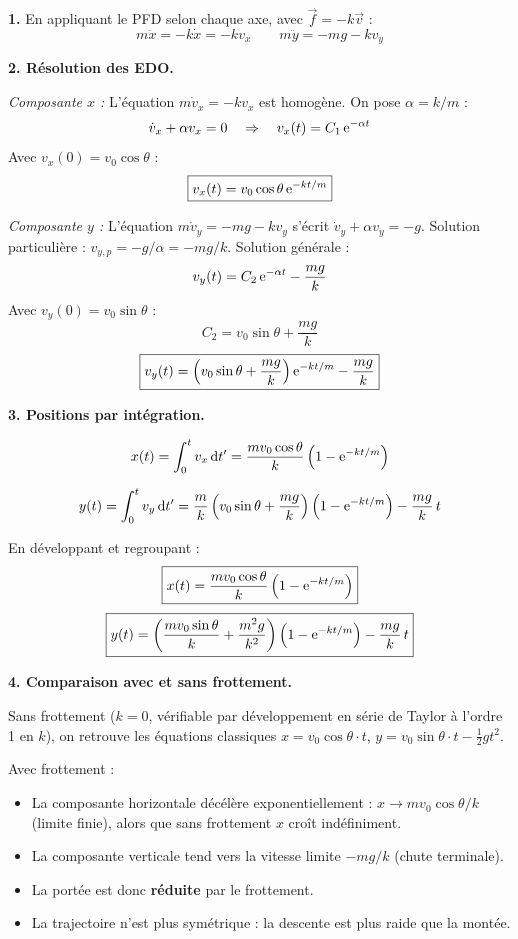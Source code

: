 \documentclass[12pt,a4paper]{article}
\begin{document}
\begin{boitecorrige}
\textbf{1.} En appliquant le PFD selon chaque axe, avec $\vec{f} = -k\vec{v}$ :
\[
m\ddot{x} = -k\dot{x} = -kv_x \qquad m\ddot{y} = -mg - kv_y
\]

\textbf{2. Résolution des EDO.}

\textit{Composante $x$ :} L'équation $m\dot{v}_x = -kv_x$ est homogène. On pose $\alpha = k/m$ :
\[
\dot{v}_x + \alpha v_x = 0 \quad \Rightarrow \quad v_x(t) = C_1\,\mathrm{e}^{-\alpha t}
\]
Avec $v_x(0) = v_0\cos\theta$ :
\[
\boxed{v_x(t) = v_0\cos\theta\,\mathrm{e}^{-kt/m}}
\]

\textit{Composante $y$ :} L'équation $m\dot{v}_y = -mg - kv_y$ s'écrit $\dot{v}_y + \alpha v_y = -g$. Solution particulière : $v_{y,p} = -g/\alpha = -mg/k$. Solution générale :
\[
v_y(t) = C_2\,\mathrm{e}^{-\alpha t} - \frac{mg}{k}
\]
Avec $v_y(0) = v_0\sin\theta$ :
\[
C_2 = v_0\sin\theta + \frac{mg}{k}
\]
\[
\boxed{v_y(t) = \left(v_0\sin\theta + \frac{mg}{k}\right)\mathrm{e}^{-kt/m} - \frac{mg}{k}}
\]

\textbf{3. Positions par intégration.}

\[
x(t) = \int_0^t v_x\,\mathrm{d} t' = \frac{mv_0\cos\theta}{k}\left(1 - \mathrm{e}^{-kt/m}\right)
\]

\[
y(t) = \int_0^t v_y\,\mathrm{d} t' = \frac{m}{k}\left(v_0\sin\theta + \frac{mg}{k}\right)\left(1 - \mathrm{e}^{-kt/m}\right) - \frac{mg}{k}\,t
\]

En développant et regroupant :
\[
\boxed{x(t) = \frac{mv_0\cos\theta}{k}\left(1 - \mathrm{e}^{-kt/m}\right)}
\]
\[
\boxed{y(t) = \left(\frac{mv_0\sin\theta}{k} + \frac{m^2 g}{k^2}\right)\left(1 - \mathrm{e}^{-kt/m}\right) - \frac{mg}{k}\,t}
\]

\textbf{4. Comparaison avec et sans frottement.}

Sans frottement ($k = 0$, vérifiable par développement en série de Taylor à l'ordre 1 en $k$), on retrouve les équations classiques $x = v_0\cos\theta\cdot t$, $y = v_0\sin\theta\cdot t - \frac{1}{2}gt^2$.

Avec frottement :
\begin{itemize}[nosep]
  \item La composante horizontale décélère exponentiellement : $x \to mv_0\cos\theta/k$ (limite finie), alors que sans frottement $x$ croît indéfiniment.
  \item La composante verticale tend vers la vitesse limite $-mg/k$ (chute terminale).
  \item La portée est donc \textbf{réduite} par le frottement.
  \item La trajectoire n'est plus symétrique : la descente est plus raide que la montée.
\end{itemize}


\end{boitecorrige}
\end{document}

